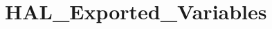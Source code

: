 \hypertarget{group___h_a_l___exported___variables}{}\section{H\+A\+L\+\_\+\+Exported\+\_\+\+Variables}
\label{group___h_a_l___exported___variables}
